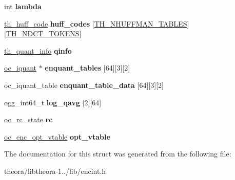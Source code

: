 \begin{DoxyCompactItemize}
\item 
\hypertarget{structth__enc__ctx_af0e0adbc8b2c679577dffcb3202a834a}{int {\bfseries lambda}}\label{structth__enc__ctx_af0e0adbc8b2c679577dffcb3202a834a}

\item 
\hypertarget{structth__enc__ctx_ab22de64959517cc3b0634412ecd9cb2e}{\hyperlink{structth__huff__code}{th\+\_\+huff\+\_\+code} {\bfseries huff\+\_\+codes} \mbox{[}\hyperlink{theora_2libtheora-1_81_81_2include_2theora_2codec_8h_a49bf449eae33c5320f0c308f32c6ae42}{T\+H\+\_\+\+N\+H\+U\+F\+F\+M\+A\+N\+\_\+\+T\+A\+B\+L\+E\+S}\mbox{]}\mbox{[}\hyperlink{theora_2libtheora-1_81_81_2include_2theora_2codec_8h_a2a44f48084e76a58cae48fb5d47cd422}{T\+H\+\_\+\+N\+D\+C\+T\+\_\+\+T\+O\+K\+E\+N\+S}\mbox{]}}\label{structth__enc__ctx_ab22de64959517cc3b0634412ecd9cb2e}

\item 
\hypertarget{structth__enc__ctx_af9e1e949651c3c96be1b8ef3beb254be}{\hyperlink{structth__quant__info}{th\+\_\+quant\+\_\+info} {\bfseries qinfo}}\label{structth__enc__ctx_af9e1e949651c3c96be1b8ef3beb254be}

\item 
\hypertarget{structth__enc__ctx_ab4559a799b0de8c34d0634a13d400a5f}{\hyperlink{structoc__iquant}{oc\+\_\+iquant} $\ast$ {\bfseries enquant\+\_\+tables} \mbox{[}64\mbox{]}\mbox{[}3\mbox{]}\mbox{[}2\mbox{]}}\label{structth__enc__ctx_ab4559a799b0de8c34d0634a13d400a5f}

\item 
\hypertarget{structth__enc__ctx_acf7d19576868f66c5a102047335cfc8d}{oc\+\_\+iquant\+\_\+table {\bfseries enquant\+\_\+table\+\_\+data} \mbox{[}64\mbox{]}\mbox{[}3\mbox{]}\mbox{[}2\mbox{]}}\label{structth__enc__ctx_acf7d19576868f66c5a102047335cfc8d}

\item 
\hypertarget{structth__enc__ctx_a036c12cc66883ceefc940000770268f0}{ogg\+\_\+int64\+\_\+t {\bfseries log\+\_\+qavg} \mbox{[}2\mbox{]}\mbox{[}64\mbox{]}}\label{structth__enc__ctx_a036c12cc66883ceefc940000770268f0}

\item 
\hypertarget{structth__enc__ctx_abab18ec6f0b2997b19bd0b7f3a586448}{\hyperlink{structoc__rc__state}{oc\+\_\+rc\+\_\+state} {\bfseries rc}}\label{structth__enc__ctx_abab18ec6f0b2997b19bd0b7f3a586448}

\item 
\hypertarget{structth__enc__ctx_a4853827339633a8bd3583f5326714ee7}{\hyperlink{structoc__enc__opt__vtable}{oc\+\_\+enc\+\_\+opt\+\_\+vtable} {\bfseries opt\+\_\+vtable}}\label{structth__enc__ctx_a4853827339633a8bd3583f5326714ee7}

\end{DoxyCompactItemize}


The documentation for this struct was generated from the following file\+:\begin{DoxyCompactItemize}
\item 
theora/libtheora-\/1../lib/encint.\+h\end{DoxyCompactItemize}
